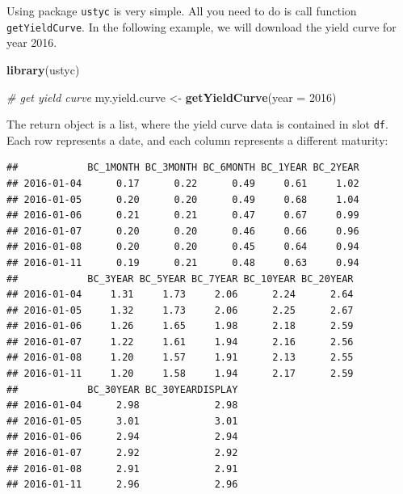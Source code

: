 \documentclass[11pt,]{book}
\newenvironment{Shaded}{\begin{snugshade}}{\end{snugshade}}
\newcommand{\KeywordTok}[1]{\textcolor[rgb]{0.27,0.27,0.27}{\textbf{#1}}}
\newcommand{\DataTypeTok}[1]{\textcolor[rgb]{0.27,0.27,0.27}{#1}}
\newcommand{\DecValTok}[1]{\textcolor[rgb]{0.06,0.06,0.06}{#1}}
\newcommand{\StringTok}[1]{\textcolor[rgb]{0.5,0.5,0.5}{#1}}
\newcommand{\CommentTok}[1]{\textcolor[rgb]{0.56,0.35,0.01}{\textit{#1}}}
\newcommand{\OperatorTok}[1]{\textcolor[rgb]{0.81,0.36,0.00}{\textbf{#1}}}
\newcommand{\NormalTok}[1]{#1}
\begin{document}
Using package \texttt{ustyc} is very simple. All you need to do is call
function \texttt{getYieldCurve}. In the following example, we will
download the yield curve for year 2016. 

\begin{Shaded}
\begin{Highlighting}[]
\KeywordTok{library}\NormalTok{(ustyc)}

\CommentTok{# get yield curve}
\NormalTok{my.yield.curve <-}\StringTok{ }\KeywordTok{getYieldCurve}\NormalTok{(}\DataTypeTok{year =} \DecValTok{2016}\NormalTok{)}
\end{Highlighting}
\end{Shaded}

The return object is a list, where the yield curve data is contained in
slot \texttt{df}. Each row represents a date, and each column represents
a different maturity:

\begin{Shaded}
\end{Shaded}

\begin{verbatim}
##            BC_1MONTH BC_3MONTH BC_6MONTH BC_1YEAR BC_2YEAR
## 2016-01-04      0.17      0.22      0.49     0.61     1.02
## 2016-01-05      0.20      0.20      0.49     0.68     1.04
## 2016-01-06      0.21      0.21      0.47     0.67     0.99
## 2016-01-07      0.20      0.20      0.46     0.66     0.96
## 2016-01-08      0.20      0.20      0.45     0.64     0.94
## 2016-01-11      0.19      0.21      0.48     0.63     0.94
##            BC_3YEAR BC_5YEAR BC_7YEAR BC_10YEAR BC_20YEAR
## 2016-01-04     1.31     1.73     2.06      2.24      2.64
## 2016-01-05     1.32     1.73     2.06      2.25      2.67
## 2016-01-06     1.26     1.65     1.98      2.18      2.59
## 2016-01-07     1.22     1.61     1.94      2.16      2.56
## 2016-01-08     1.20     1.57     1.91      2.13      2.55
## 2016-01-11     1.20     1.58     1.94      2.17      2.59
##            BC_30YEAR BC_30YEARDISPLAY
## 2016-01-04      2.98             2.98
## 2016-01-05      3.01             3.01
## 2016-01-06      2.94             2.94
## 2016-01-07      2.92             2.92
## 2016-01-08      2.91             2.91
## 2016-01-11      2.96             2.96
\end{verbatim}
\end{document}
